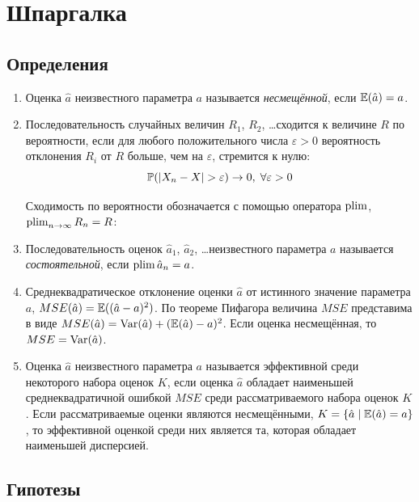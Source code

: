 \documentclass[12pt, a4paper]{article}
\begin{document}



\section{Шпаргалка}

\subsection{Определения}


\begin{enumerate}

  \item Оценка $\hat a$ неизвестного параметра $a$ называется \textit{несмещённой}, если $\E(\hat a) = a$.

  \item Последовательность случайных величин $R_1$, $R_2$, \ldots сходится к величине $R$ по вероятности, если
  для любого положительного числа $\varepsilon >0$ вероятность отклонения $R_i$ от $R$ больше, чем на $\varepsilon$, 
  стремится к нулю:
  \[
  \P(|X_n - X| > \varepsilon ) \to 0, \; \forall \varepsilon > 0
  \]

Сходимость по вероятности обозначается с помощью оператора $\plim$, $\plim_{n\to\infty} R_n = R$:


  \item Последовательность оценок $\hat a_1$, $\hat a_2$, \ldots неизвестного параметра $a$ называется \textit{состоятельной}, если $\plim \hat a_n = a$.

 
\item Среднеквадратическое отклонение оценки $\hat a$ от истинного значение параметра $a$, $MSE(\hat a)=\E((\hat a - a)^2)$. По теореме Пифагора величина $MSE$ представима в виде $MSE(\hat a) = \Var(\hat a) + (\E(\hat a) - a)^2$. Если оценка несмещённая, то $MSE = \Var(\hat a)$.

\item Оценка $\hat a$ неизвестного параметра $a$ называется эффективной среди некоторого набора оценок $K$, 
если оценка $\hat a$ обладает наименьшей среднеквадратичной ошибкой $MSE$ среди рассматриваемого набора оценок $K$. 
Если рассматриваемые оценки являются несмещёнными, $K = \{\hat a \mid \E(\hat a) = a\}$, 
то эффективной оценкой среди них является та, которая обладает наименьшей дисперсией.

\end{enumerate}


\subsection{Гипотезы}
\end{document}
